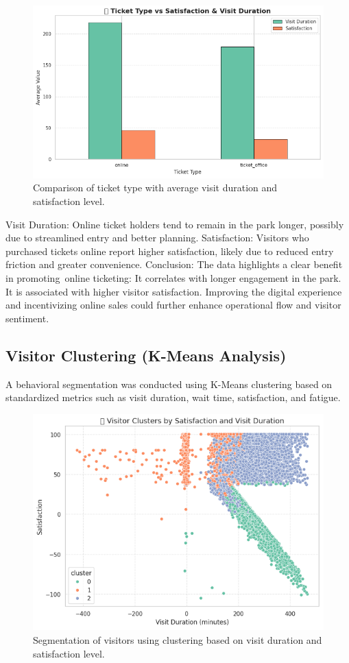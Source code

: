 \documentclass[12pt]{article}
\begin{document}
\begin{figure}[H]
    \centering
    \includegraphics[width=1\textwidth]{ticket_type_comparison.png}
    \caption{Comparison of ticket type with average visit duration and satisfaction level.}
    \label{fig:ticket-type-comparison}
\end{figure}

Visit Duration:
Online ticket holders tend to remain in the park longer, possibly due to streamlined entry and better planning.
Satisfaction:
Visitors who purchased tickets online report higher satisfaction, likely due to reduced entry friction and greater convenience.
Conclusion:
The data highlights a clear benefit in promoting online ticketing:
It correlates with longer engagement in the park.
It is associated with higher visitor satisfaction.
Improving the digital experience and incentivizing online sales could further enhance operational flow and visitor sentiment.
\subsection{Visitor Clustering (K-Means Analysis)}
A behavioral segmentation was conducted using K-Means clustering based on standardized metrics such as visit duration, wait time, satisfaction, and fatigue.

\begin{figure}[H]
    \centering
    \includegraphics[width=1\textwidth]{visitor_clusters.png}
    \caption{Segmentation of visitors using clustering based on visit duration and satisfaction level.}
    \label{fig:visitor-clusters}
\end{figure}
\end{document}
